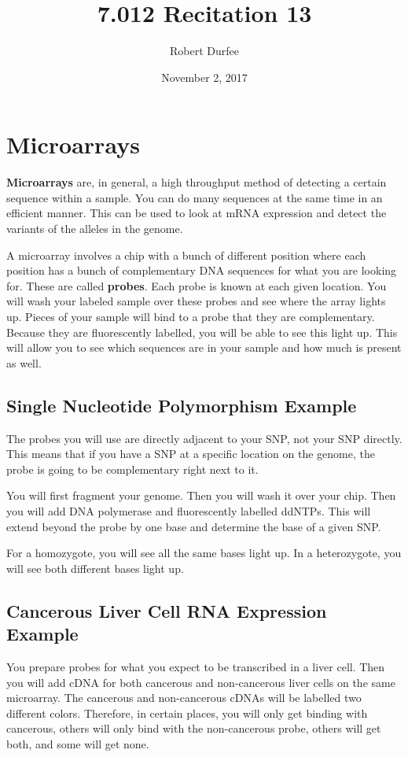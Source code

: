 \documentclass{article}
\title{7.012 Recitation 13}
\author{Robert Durfee}
\date{November 2, 2017}
\begin{document}
\maketitle

\section{Microarrays}

\textbf{Microarrays} are, in general, a high throughput method of detecting a
certain sequence within a sample. You can do many sequences at the same time in
an efficient manner. This can be used to look at mRNA expression and detect the
variants of the alleles in the genome. 

A microarray involves a chip with a bunch of different position where each
position has a bunch of complementary DNA sequences for what you are looking
for. These are called \textbf{probes}. Each probe is known at each given
location. You will wash your labeled sample over these probes and see where the
array lights up. Pieces of your sample will bind to a probe that they are
complementary. Because they are fluorescently labelled, you will be able to see
this light up. This will allow you to see which sequences are in your sample and
how much is present as well.

\subsection{Single Nucleotide Polymorphism Example}

The probes you will use are directly adjacent to your SNP, not your SNP
directly. This means that if you have a SNP at a specific location on the
genome, the probe is going to be complementary right next to it.

You will first fragment your genome. Then you will wash it over your chip. Then
you will add DNA polymerase and fluorescently labelled ddNTPs. This will extend
beyond the probe by one base and determine the base of a given SNP.

For a homozygote, you will see all the same bases light up. In a heterozygote,
you will see both different bases light up. 

\subsection{Cancerous Liver Cell RNA Expression Example}

You prepare probes for what you expect to be transcribed in a liver cell. Then
you will add cDNA for both cancerous and non-cancerous liver cells on the same
microarray. The cancerous and non-cancerous cDNAs will be labelled two different
colors. Therefore, in certain places, you will only get binding with cancerous,
others will only bind with the non-cancerous probe, others will get both, and
some will get none.
\end{document}
